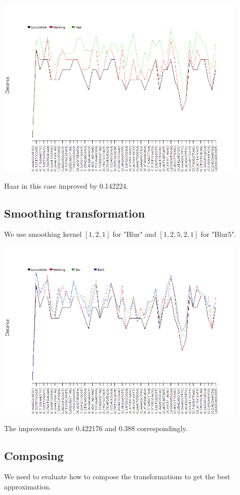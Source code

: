\documentclass [12pt, a4]{article} %
\begin{document}
\includegraphics[width=0.9\textwidth]{img/haar.png}

Haar in this case improved by 0.142224.

\subsection{Smoothing transformation}

We use smoothing kernel $[1,2,1]$ for "Blur" and $[1,2,5,2,1]$ for "Blur5".

\includegraphics[width=0.9\textwidth]{img/blur.png}

The improvements are 0.422176 and 0.388 correspondingly.

\subsection{Composing}

We need to evaluate how to compose the transformations to get the best approximation.
\end{document}
